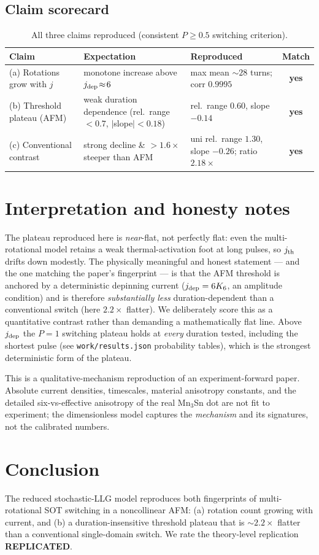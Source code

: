 \documentclass[11pt]{article}
\begin{document}
\subsection{Claim scorecard}
\begin{table}[htbp]
\centering
\small
\begin{tabular}{p{4.4cm} p{4.2cm} p{4.6cm} c}
\toprule
Claim & Expectation & Reproduced & Match\\
\midrule
(a) Rotations grow with $j$ &
monotone increase above $j_{\rm dep}\!\approx\!6$ &
max mean $\sim\!28$ turns; corr $0.9995$ &
\textcolor{green!55!black}{\textbf{yes}}\\
(b) Threshold plateau (AFM) &
weak duration dependence (rel.\ range $<0.7$, $|$slope$|<0.18$) &
rel.\ range $0.60$, slope $-0.14$ &
\textcolor{green!55!black}{\textbf{yes}}\\
(c) Conventional contrast &
strong decline \& $>1.6\times$ steeper than AFM &
uni rel.\ range $1.30$, slope $-0.26$; ratio $2.18\times$ &
\textcolor{green!55!black}{\textbf{yes}}\\
\bottomrule
\end{tabular}
\caption{All three claims reproduced (consistent $P\ge0.5$ switching criterion).}
\end{table}

\section{Interpretation and honesty notes}
The plateau reproduced here is \emph{near}-flat, not perfectly flat: even the
multi-rotational model retains a weak thermal-activation foot at long pulses,
so $j_{\rm th}$ drifts down modestly. The physically meaningful and honest
statement --- and the one matching the paper's fingerprint --- is that the AFM
threshold is anchored by a deterministic depinning current
($j_{\rm dep}=6K_6$, an amplitude condition) and is therefore
\emph{substantially less} duration-dependent than a conventional switch (here
$2.2\times$ flatter). We deliberately score this as a quantitative contrast
rather than demanding a mathematically flat line. Above $j_{\rm dep}$ the
$P\!=\!1$ switching plateau holds at \emph{every} duration tested, including
the shortest pulse (see \texttt{work/results.json} probability tables), which
is the strongest deterministic form of the plateau.

This is a qualitative-mechanism reproduction of an experiment-forward paper.
Absolute current densities, timescales, material anisotropy constants, and the
detailed six-vs-effective anisotropy of the real Mn$_3$Sn dot are not fit to
experiment; the dimensionless model captures the \emph{mechanism} and its
signatures, not the calibrated numbers.

\section{Conclusion}
The reduced stochastic-LLG model reproduces both fingerprints of
multi-rotational SOT switching in a noncollinear AFM: (a) rotation count
growing with current, and (b) a duration-insensitive threshold plateau that is
$\sim\!2.2\times$ flatter than a conventional single-domain switch. We rate the
theory-level replication \textbf{REPLICATED}.
\end{document}
